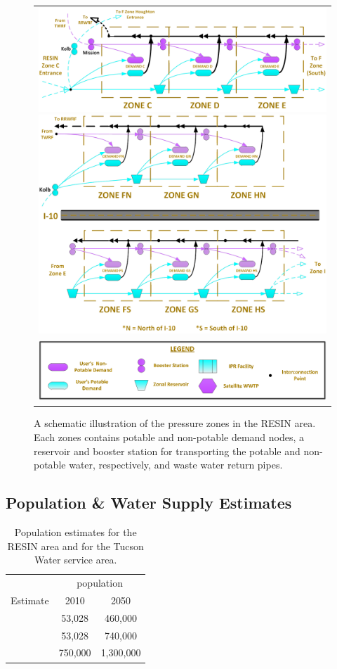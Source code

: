 \documentclass[11pt]{article}
\theoremstyle{plain}
\theoremstyle{definition}
\theoremstyle{remark}
\begin{document}
\begin{figure}
	\centering
	\begin{tabular}{c}
		\includegraphics*[width=.48\textwidth]{tucson_water_images/zones_c_e.png}%
		\includegraphics*[width=.48\textwidth]{tucson_water_images/zones_split.png} \\
		\includegraphics*[width=.6\textwidth]{tucson_water_images/zones_legend.png}
	\end{tabular}
	\caption{
		A schematic illustration of the pressure zones in the RESIN area.
		Each zones contains potable and non-potable demand nodes, a reservoir and booster station for transporting the potable and non-potable water, respectively, and waste water return pipes.
	}
	\label{fig:tucson_zones}
\end{figure}


\subsection{Population \& Water Supply Estimates}
\label{ssec:population_supply_estimates}

\begin{table}
	\centering
	\begin{tabular}{lcc}
		\hline
		         & \multicolumn{2}{c}{population} \\
		Estimate & 2010 & 2050 \\
		\hline
		\citet{taz}    &  53,028 &   460,000 \\
		\citet{wisp}   &  53,028 &   740,000 \\
		\hline
		\citet{tucson} & 750,000 & 1,300,000 \\
		\hline
	\end{tabular}
	\caption{
		Population estimates for the RESIN area and for the Tucson Water service area.
	}
	\label{tb:population}
\end{table}
\end{document}
